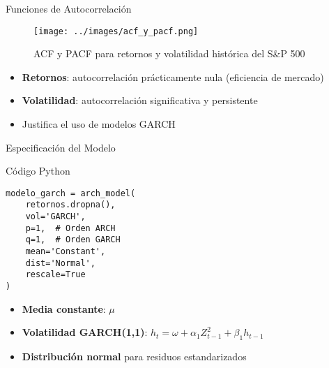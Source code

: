 \begin{frame}{Funciones de Autocorrelación}
    \begin{figure}
        \centering
        \texttt{[image: ../images/acf\_y\_pacf.png]}
        \caption{ACF y PACF para retornos y volatilidad histórica del S\&P 500}
    \end{figure}
    
    \vspace{0.5em}
    
    \begin{itemize}
        \item<2-> \textbf{Retornos}: autocorrelación prácticamente nula (eficiencia de mercado)
        \item<3-> \textbf{Volatilidad}: autocorrelación significativa y persistente
        \item<4-> Justifica el uso de modelos GARCH
    \end{itemize}
\end{frame}

\begin{frame}[fragile]{Especificación del Modelo}
    \begin{block}{Código Python}
        \begin{verbatim}
modelo_garch = arch_model(
    retornos.dropna(),
    vol='GARCH',
    p=1,  # Orden ARCH
    q=1,  # Orden GARCH
    mean='Constant',
    dist='Normal',
    rescale=True
)
        \end{verbatim}
    \end{block}
    
    \vspace{0.5em}
    
    \begin{itemize}
        \item<2-> \textbf{Media constante}: $\mu$
        \item<3-> \textbf{Volatilidad GARCH(1,1)}: $h_t = \omega + \alpha_1 Z_{t-1}^2 + \beta_1 h_{t-1}$
        \item<4-> \textbf{Distribución normal} para residuos estandarizados
    \end{itemize}
\end{frame}

